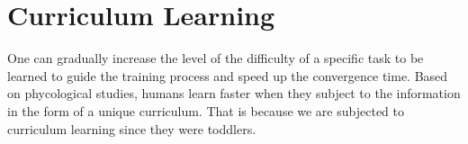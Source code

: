\chapter{Curriculum Learning}

One can gradually increase the level of the difficulty of a specific task to be learned to guide the training process and speed up the convergence time. Based on phycological studies, humans learn faster when they subject to the information in the form of a unique curriculum. That is because we are subjected to curriculum learning since they were toddlers. 

